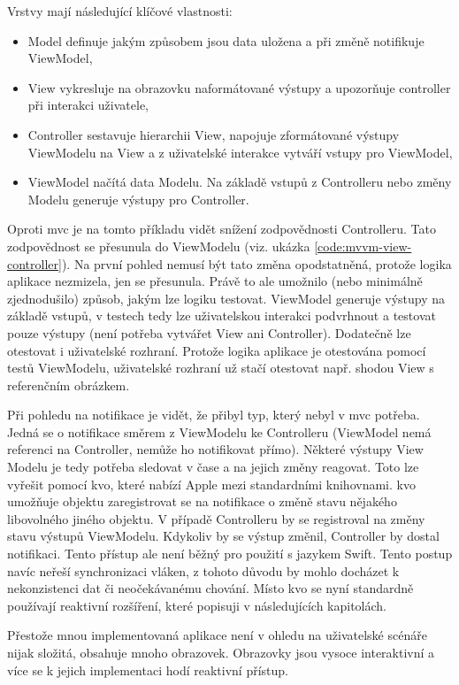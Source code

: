 Vrstvy mají následující klíčové vlastnosti:
\begin{itemize}
  \item Model definuje jakým způsobem jsou data uložena a při změně notifikuje ViewModel,
  \item View vykresluje na obrazovku naformátované výstupy a upozorňuje controller při interakci uživatele,
  \item Controller sestavuje hierarchii View, napojuje zformátované výstupy ViewModelu na View a z uživatelské interakce vytváří vstupy pro ViewModel,
  \item ViewModel načítá data Modelu. Na základě vstupů z Controlleru nebo změny Modelu generuje výstupy pro Controller.
\end{itemize}

Oproti \acrshort{mvc} je na tomto příkladu vidět snížení zodpovědnosti Controlleru.
Tato zodpovědnost se přesunula do ViewModelu (viz. ukázka \ref{code:mvvm-view-controller}).
Na první pohled nemusí být tato změna opodstatněná, protože logika aplikace nezmizela, jen se přesunula.
Právě to ale umožnilo (nebo minimálně zjednodušilo) způsob, jakým lze logiku testovat.
ViewModel generuje výstupy na základě vstupů, v testech tedy lze uživatelskou interakci podvrhnout a testovat pouze výstupy (není potřeba vytvářet View ani Controller).
Dodatečně lze otestovat i uživatelské rozhraní.
Protože logika aplikace je otestována pomocí testů ViewModelu, uživatelské rozhraní už stačí otestovat např. shodou View s referenčním obrázkem.


Při pohledu na notifikace je vidět, že přibyl typ, který nebyl v \acrshort{mvc} potřeba.
Jedná se o notifikace směrem z ViewModelu ke Controlleru (ViewModel nemá referenci na Controller, nemůže ho notifikovat přímo).
Některé výstupy View Modelu je tedy potřeba sledovat v čase a na jejich změny reagovat.
Toto lze vyřešit pomocí \acrshort{kvo}, které nabízí Apple mezi standardními knihovnami.
\acrshort{kvo} umožňuje objektu zaregistrovat se na notifikace o změně stavu nějakého libovolného jiného objektu.
V případě Controlleru by se registroval na změny stavu výstupů ViewModelu.
Kdykoliv by se výstup změnil, Controller by dostal notifikaci.
Tento přístup ale není běžný pro použití s jazykem Swift.
Tento postup navíc neřeší synchronizaci vláken, z tohoto důvodu by mohlo docházet k nekonzistenci dat či neočekávanému chování.
Místo \acrshort{kvo} se nyní standardně používají reaktivní rozšíření, které popisuji v následujících kapitolách.

Přestože mnou implementovaná aplikace není v ohledu na uživatelské scénáře nijak složitá, obsahuje mnoho obrazovek.
Obrazovky jsou vysoce interaktivní a více se k jejich implementaci hodí reaktivní přístup.

